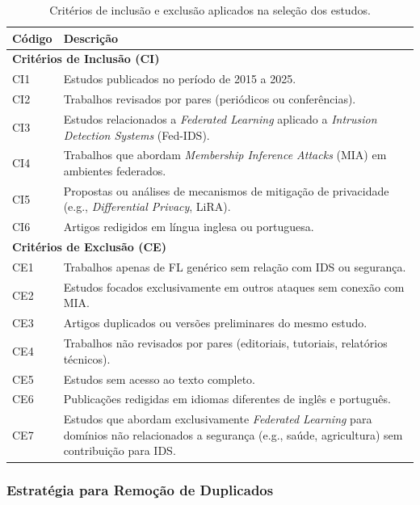 \documentclass[
	12pt,				%
	openright,			%
	oneside,			%
	a4paper,			%
	english,			%
	french,				%
	spanish,			%
	brazil,				%
	]{abntex2}
\begin{document}
\begin{table}[H]
\centering
\caption{Critérios de inclusão e exclusão aplicados na seleção dos estudos.}
\label{tab:criterios}
\begin{tabular}{p{2cm} p{11cm}}
\hline
\textbf{Código} & \textbf{Descrição} \\
\hline
\multicolumn{2}{l}{\textbf{Critérios de Inclusão (CI)}} \\ \hline
CI1 & Estudos publicados no período de 2015 a 2025. \\
CI2 & Trabalhos revisados por pares (periódicos ou conferências). \\
CI3 & Estudos relacionados a \textit{Federated Learning} aplicado a \textit{Intrusion Detection Systems} (Fed-IDS). \\
CI4 & Trabalhos que abordam \textit{Membership Inference Attacks} (MIA) em ambientes federados. \\
CI5 & Propostas ou análises de mecanismos de mitigação de privacidade (e.g., \textit{Differential Privacy}, LiRA). \\
CI6 & Artigos redigidos em língua inglesa ou portuguesa. \\
\hline
\multicolumn{2}{l}{\textbf{Critérios de Exclusão (CE)}} \\ \hline
CE1 & Trabalhos apenas de FL genérico sem relação com IDS ou segurança. \\
CE2 & Estudos focados exclusivamente em outros ataques sem conexão com MIA. \\
CE3 & Artigos duplicados ou versões preliminares do mesmo estudo. \\
CE4 & Trabalhos não revisados por pares (editoriais, tutoriais, relatórios técnicos). \\
CE5 & Estudos sem acesso ao texto completo. \\
CE6 & Publicações redigidas em idiomas diferentes de inglês e português. \\
CE7 & Estudos que abordam exclusivamente \textit{Federated Learning} para domínios não relacionados a segurança (e.g., saúde, agricultura) sem contribuição para IDS. \\
\hline
\end{tabular}
\end{table}

\subsubsection{Estratégia para Remoção de Duplicados}
\end{document}
